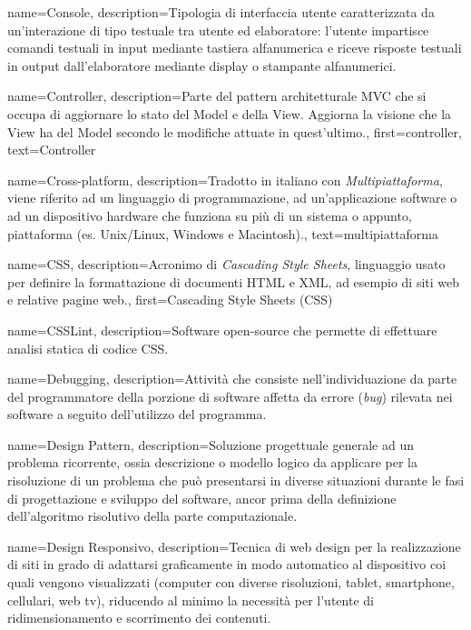 {
name={Console},
description={Tipologia di interfaccia utente caratterizzata da un'interazione di tipo testuale tra utente ed elaboratore: l'utente impartisce comandi testuali in input mediante tastiera alfanumerica e riceve risposte testuali in output dall'elaboratore mediante display o stampante alfanumerici.}
}

{
name={Controller},
description={Parte del pattern architetturale MVC che si occupa di aggiornare lo stato del Model e della View. Aggiorna la visione che la View ha del Model secondo le modifiche attuate in quest'ultimo.},
first={controller},
text={Controller}
}

{
name={Cross-platform},
description={Tradotto in italiano con \textit{Multipiattaforma}, viene riferito ad un linguaggio di programmazione, ad un'applicazione software o ad un dispositivo hardware che funziona su più di un sistema o appunto, piattaforma (es. Unix/Linux, Windows e Macintosh).},
text={multipiattaforma}
}

{
name={CSS},
description={Acronimo di \textit{Cascading Style Sheets}, linguaggio usato per definire la formattazione di documenti HTML e XML, ad esempio di siti web e relative pagine web.},
first={Cascading Style Sheets (CSS)}
}

{
name={CSSLint},
description={Software open-source che permette di effettuare analisi statica di codice CSS.}
}

{
name={Debugging},
description={Attività che consiste nell'individuazione da parte del programmatore della porzione di software affetta da errore (\textit{bug}) rilevata nei software a seguito dell'utilizzo del programma.}
}

{
name={Design Pattern},
description={Soluzione progettuale generale ad un problema ricorrente, ossia descrizione o modello logico da applicare per la risoluzione di un problema che può presentarsi in diverse situazioni durante le fasi di progettazione e sviluppo del software, ancor prima della definizione dell'algoritmo risolutivo della parte computazionale.}
}

{
name={Design Responsivo},
description={Tecnica di web design per la realizzazione di siti in grado di adattarsi graficamente in modo automatico al dispositivo coi quali vengono visualizzati (computer con diverse risoluzioni, tablet, smartphone, cellulari, web tv), riducendo al minimo la necessità per l'utente di ridimensionamento e scorrimento dei contenuti.}
}


